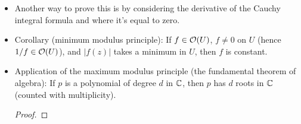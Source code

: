 \documentclass[../notes.tex]{subfiles}
\begin{document}
\begin{itemize}
\begin{proof}
        Combining this with the fact that the above integrand is always $\leq 0$ because $f(z_0)$ is a local maximum, we have that
        \begin{align*}
            |f(z_0+r\e[i\theta])|-|f(z_0)| &= 0\\
            |f(\zeta)| &= |f(z_0)|
        \end{align*}
        on $\partial D$. Note that this is true for all small $\partial D$'s centered at $z_0$.\par
        Now since $|f|$ is constant on $\partial D$, we must have that $|f|^2=f\cdot\bar{f}$ is constant on $\partial D$. Taking the Wirtinger derivative and using its product rule gets us
        \begin{equation*}
            0 = \pdv{z}(f\cdot\bar{f}) = f_z\cdot\bar{f}+f\cdot\bar{f}_z
        \end{equation*}
        Since $f$ is holomorphic (hence satisfies the CR equations) and $f_{\bar{z}}=\bar{f}_z$, we have that
        \begin{equation*}
            \bar{f}_z = f_{\bar{z}} = 0
        \end{equation*}
        Thus,
        \begin{equation*}
            0 = f_z\cdot\bar{f}+f\cdot 0 = f_z\cdot\bar{f}
        \end{equation*}
        By the zero-product property, either $f_z=0$ and $\bar{f}=0$. In the first case, this means that $f$ is constant, as desired. In the second case, this means that $f$ is zero (and hence constant), as desired.\par
        At this point, we have shown that $f$ is constant on a small disk. Therefore, we need only invoke the identity theorem, which tells us that since the function is constant for a little bit somewhere, it is constant everywhere.
    \end{proof}
    \item Another way to prove this is by considering the derivative of the Cauchy integral formula and where it's equal to zero.
    \item Corollary (minimum modulus principle): If $f\in\mathcal{O}(U)$, $f\neq 0$ on $U$ (hence $1/f\in\mathcal{O}(U)$), and $|f(z)|$ takes a minimum in $U$, then $f$ is constant.
    \item Application of the maximum modulus principle (the fundamental theorem of algebra): If $p$ is a polynomial of degree $d$ in $\mathbb{C}$, then $p$ has $d$ roots in $\mathbb{C}$ (counted with multiplicity).
    \begin{proof}

\end{proof}
\end{itemize}
\end{document}
